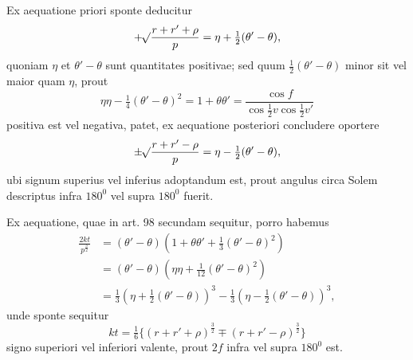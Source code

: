 \par
Ex aequatione priori sponte deducitur
\[
+\mathord{{}^{}\!\surd}\frac{r+r'+\rho}{p}=\eta+\tfrac12(\theta'-\theta),
\]
\noindent quoniam $\eta$ et $\theta'-\theta$ sunt quantitates positivae; sed quum $\tfrac12(\theta'-\theta)$ minor sit vel maior quam $\eta$, prout
\[
\eta\eta-\tfrac14(\theta'-\theta)^2=1+\theta\theta'=\frac{\cos f}{\cos\tfrac12v\cos\tfrac12v'}
\]
\noindent positiva est vel negativa, patet, ex aequatione posteriori concludere oportere
\[
\pm\mathord{{}^{}\!\surd}\frac{r+r'-\rho}{p}=\eta-\tfrac12(\theta'-\theta),
\]
\noindent ubi signum superius vel inferius adoptandum est, prout angulus circa Solem descriptus infra $180^0$ vel supra $180^0$ fuerit.
\par
Ex aequatione, quae in art. 98 secundam sequitur, porro habemus
\[
\begin{aligned}
\frac{2kt}{p^{\frac32}}&=(\theta'-\theta)(1+\theta\theta'+\tfrac13(\theta'-\theta)^2)\\[.6em]
&=(\theta'-\theta)(\eta\eta+\tfrac1{12}(\theta'-\theta)^2)\\[.6em]
&=\tfrac13(\eta+\tfrac12(\theta'-\theta))^3-\tfrac13(\eta-\tfrac12(\theta'-\theta))^3,
\end{aligned}
\]
\noindent unde sponte sequitur
\[
kt=\tfrac16\{(r+r'+\rho)^{\frac32}\mp(r+r'-\rho)^{\frac32}\}
\]
\noindent signo superiori vel inferiori valente, prout $2f$ infra vel supra $180^0$ est.
